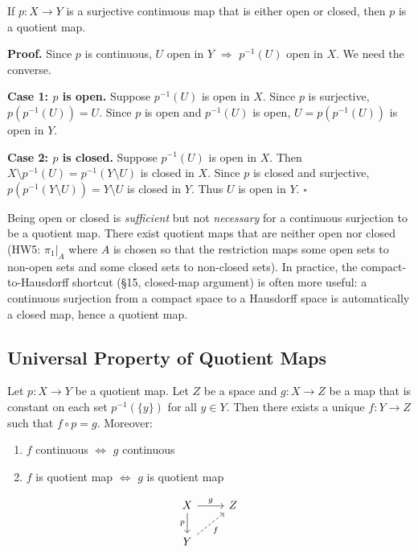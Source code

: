 \documentclass[11pt]{report}
\renewenvironment{proof}[1][Proof]{\noindent\textbf{#1.} }{\hfill$\square$\par\vspace{5pt}}
\begin{document}
\begin{propbox}
If $p: X \to Y$ is a surjective continuous map that is either open or closed, then $p$ is a quotient map.
\end{propbox}

\begin{proof}
Since $p$ is continuous, $U$ open in $Y$ $\Rightarrow$ $p^{-1}(U)$ open in $X$. We need the converse.

\textbf{Case 1: $p$ is open.} Suppose $p^{-1}(U)$ is open in $X$. Since $p$ is surjective, $p(p^{-1}(U)) = U$. Since $p$ is open and $p^{-1}(U)$ is open, $U = p(p^{-1}(U))$ is open in $Y$.

\textbf{Case 2: $p$ is closed.} Suppose $p^{-1}(U)$ is open in $X$. Then $X \setminus p^{-1}(U) = p^{-1}(Y \setminus U)$ is closed in $X$. Since $p$ is closed and surjective, $p(p^{-1}(Y \setminus U)) = Y \setminus U$ is closed in $Y$. Thus $U$ is open in $Y$.
\end{proof}

\begin{rembox}
Being open or closed is \emph{sufficient} but not \emph{necessary} for a continuous surjection to be a quotient map. There exist quotient maps that are neither open nor closed (HW5: $\pi_1|_A$ where $A$ is chosen so that the restriction maps some open sets to non-open sets and some closed sets to non-closed sets). In practice, the compact-to-Hausdorff shortcut (\S 15, closed-map argument) is often more useful: a continuous surjection from a compact space to a Hausdorff space is automatically a closed map, hence a quotient map.
\end{rembox}

\subsection{Universal Property of Quotient Maps}

\begin{thmbox}
Let $p: X \to Y$ be a quotient map. Let $Z$ be a space and $g: X \to Z$ be a map that is constant on each set $p^{-1}(\{y\})$ for all $y \in Y$. Then there exists a unique $f: Y \to Z$ such that $f \circ p = g$. Moreover:
\begin{enumerate}
    \item $f$ continuous $\Leftrightarrow$ $g$ continuous
    \item $f$ is quotient map $\Leftrightarrow$ $g$ is quotient map
\end{enumerate}
\[
\begin{tikzcd}
X \arrow[r, "g"] \arrow[d, "p"'] & Z \\
Y \arrow[ur, "f"', dashed] &
\end{tikzcd}
\]
\end{thmbox}
\end{document}
